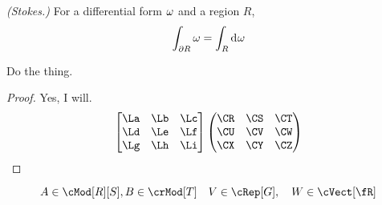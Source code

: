 \documentclass[11pt]{article}
\begin{document}
\begin{thm*} {\em (Stokes.)}
    For a differential form $\omega$ and a region $R$, 
    \[ \int_{\del R}\om = \int_R \D \om \]
\end{thm*}


\begin{psetProblem}
    Do the thing.
    \begin{proof}
        Yes, I will.
        \[ 
            \bthree{\La}{\Lb}{\Lc}{\Ld}{\Le}{\Lf}{\Lg}{\Lh}{\Li}
            \pthree{\CR}{\CS}{\CT}{\CU}{\CV}{\CW}{\CX}{\CY}{\CZ} 
        \]
    \end{proof}
\end{psetProblem}

\[ A \in \cMod[R][S], B \in \crMod[T] \quad V \in \cRep[G], \quad W \in \cVect[\R] \]
\end{document}
